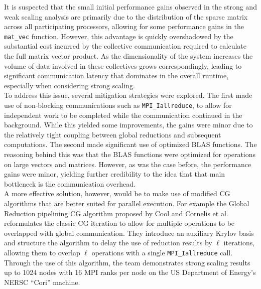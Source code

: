 It is suspected that the small initial performance gains observed in the strong and weak scaling analysis are primarily
due to the distribution of the sparse matrix across all participating processors, allowing for some performance gains in
the \lstinline[language=C]|mat_vec| function. However, this advantage is quickly overshadowed by the substantial
cost incurred by the collective communication required to calculate the full matrix vector product. As the
dimensionality of the system increases the volume of data involved in these collectives grows correspondingly, leading
to significant communication latency that dominates in the overall runtime, especially when considering strong scaling.
\\
To address this issue, several mitigation strategies were explored. The first made use of non-blocking communications
such as \lstinline[language=C]|MPI_Iallreduce|, to allow for independent work to be completed while the communication continued in the
background. While this yielded some improvements, the gains were minor due to the relatively tight coupling between
global reductions and subsequent computations. The second made significant use of optimized BLAS functions. The
reasoning behind this was that the BLAS functions were optimized for operations on large vectors and matrices. However,
as was the case before, the performance gains were minor, yielding further credibility to the idea that that main
bottleneck is the communication overhead. \\
A more effective solution, however, would be to make use of modified CG algorithms that are better suited for parallel
execution. For example the Global Reduction pipelining CG algorithm proposed by Cool and Cornelis et al.
\cite{cools2019improvingstrongscalingconjugate} reformulates the classic CG iteration to allow for multiple operations
to be overlapped with global communication. They introduce an auxiliary Krylov basis and structure the algorithm to
delay the use of reduction results by $\ell$ iterations, allowing them to overlap $\ell$ operations with a single
\lstinline[language=C]|MPI_Iallreduce| call. Through the use of this algorithm, the team demonstrates strong scaling
results up to 1024 nodes with 16 MPI ranks per node on the US Department of Energy's NERSC ``Cori'' machine.